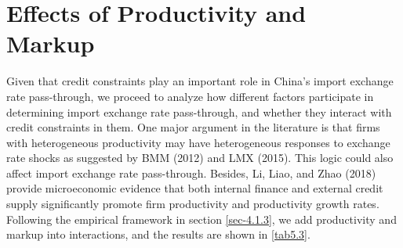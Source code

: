 \section{Effects of Productivity and Markup}

Given that credit constraints play an important role in China's import exchange rate pass-through, we proceed to analyze how different factors participate in determining import exchange rate pass-through, and whether they interact with credit constraints in them. One major argument in the literature is that firms with heterogeneous productivity may have heterogeneous responses to exchange rate shocks as suggested by BMM (2012)\cite{bmm2012} and LMX (2015)\cite{lmx2015}. This logic could also affect import exchange rate pass-through. Besides, Li, Liao, and Zhao (2018)\cite{llz2018} provide microeconomic evidence that both internal finance and external credit supply significantly promote firm productivity and productivity growth rates. Following the empirical framework in section \ref{sec-4.1.3}, we add productivity and markup into interactions, and the results are shown in \ref{tab5.3}.

